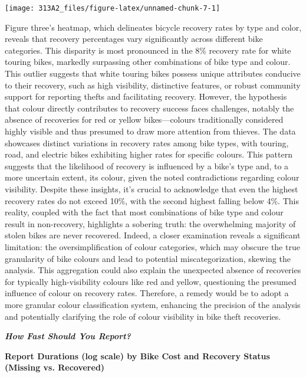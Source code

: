 \documentclass[
  11pt,
]{article}
\begin{document}
\begin{center}\texttt{[image: 313A2\_files/figure-latex/unnamed-chunk-7-1]} \end{center}

\indent Figure three's heatmap, which delineates bicycle recovery rates
by type and color, reveals that recovery percentages vary significantly
across different bike categories. This disparity is most pronounced in
the 8\% recovery rate for white touring bikes, markedly surpassing other
combinations of bike type and colour. This outlier suggests that white
touring bikes possess unique attributes conducive to their recovery,
such as high visibility, distinctive features, or robust community
support for reporting thefts and facilitating recovery. However, the
hypothesis that colour directly contributes to recovery success faces
challenges, notably the absence of recoveries for red or yellow
bikes---colours traditionally considered highly visible and thus
presumed to draw more attention from thieves. The data showcases
distinct variations in recovery rates among bike types, with touring,
road, and electric bikes exhibiting higher rates for specific colours.
This pattern suggests that the likelihood of recovery is influenced by a
bike's type and, to a more uncertain extent, its colour, given the noted
contradictions regarding colour visibility. Despite these insights, it's
crucial to acknowledge that even the highest recovery rates do not
exceed 10\%, with the second highest falling below 4\%. This reality,
coupled with the fact that most combinations of bike type and colour
result in non-recovery, highlights a sobering truth: the overwhelming
majority of stolen bikes are never recovered. Indeed, a closer
examination reveals a significant limitation: the oversimplification of
colour categories, which may obscure the true granularity of bike
colours and lead to potential miscategorization, skewing the analysis.
This aggregation could also explain the unexpected absence of recoveries
for typically high-visibility colours like red and yellow, questioning
the presumed influence of colour on recovery rates. Therefore, a remedy
would be to adopt a more granular colour classification system,
enhancing the precision of the analysis and potentially clarifying the
role of colour visibility in bike theft recoveries.

\textit{\textbf{{How Fast Should You Report?}}}

\textbf{\footnotesize{
Report Durations (log scale) by Bike Cost and Recovery Status (Missing vs. Recovered)}}
\end{document}
